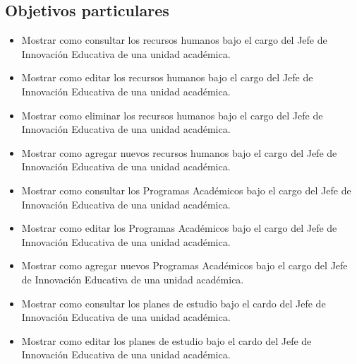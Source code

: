     \subsection{Objetivos particulares}
    \begin{itemize}
        \item Mostrar como consultar los recursos humanos bajo el cargo del Jefe de Innovación Educativa de una unidad académica.
        \item Mostrar como editar los recursos humanos bajo el cargo del Jefe de Innovación Educativa de una unidad académica.
        \item Mostrar como eliminar los recursos humanos bajo el cargo del Jefe de Innovación Educativa de una unidad académica.
        \item Mostrar como agregar nuevos recursos humanos bajo el cargo del Jefe de Innovación Educativa de una unidad académica.
         \item Mostrar como consultar los Programas Académicos bajo el cargo del Jefe de Innovación Educativa de una unidad académica.
        \item Mostrar como editar los Programas Académicos bajo el cargo del Jefe de Innovación Educativa de una unidad académica.
        \item Mostrar como agregar nuevos Programas Académicos bajo el cargo del Jefe de Innovación Educativa de una unidad académica.
        \item Mostrar como consultar los planes de estudio bajo el cardo del Jefe de Innovación Educativa de una unidad académica.
        \item Mostrar como editar los planes de estudio bajo el cardo del Jefe de Innovación Educativa de una unidad académica.
        
    \end{itemize}
